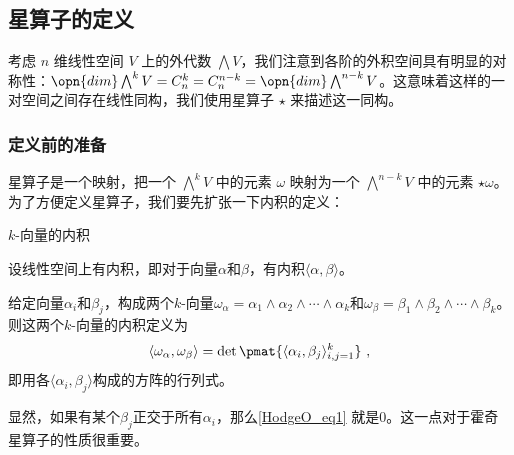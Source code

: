


\subsection{星算子的定义}

考虑 $n$ 维线性空间 $V$ 上的外代数 $\bigwedge V$，我们注意到各阶的外积空间具有明显的对称性：$\opn{dim}\bigwedge^k V=C^k_n=C^{n-k}_n=\opn{dim}\bigwedge^{n-k} V$。这意味着这样的一对空间之间存在线性同构，我们使用星算子 $\star$ 来描述这一同构。


\subsubsection{定义前的准备}


星算子是一个映射，把一个 $\bigwedge^k V$ 中的元素 $\omega$ 映射为一个 $\bigwedge^{n-k} V$ 中的元素 $\star\omega$。为了方便定义星算子，我们要先扩张一下内积的定义：


\begin{definition}{$k$-向量的内积}\label{HodgeO_def1}

设线性空间上有内积，即对于向量$\alpha$和$\beta$，有内积$\langle \alpha, \beta \rangle$。

给定向量$\alpha_i$和$\beta_j$，构成两个$k$-向量$\omega_\alpha=\alpha_1\wedge \alpha_2\wedge \cdots\wedge \alpha_k$和$\omega_\beta=\beta_1\wedge \beta_2\wedge \cdots\wedge \beta_k$。则这两个$k$-向量的内积定义为
\begin{equation}\label{HodgeO_eq1}
\langle\omega_\alpha, \omega_\beta\rangle = \det \pmat{\langle \alpha_i, \beta_j \rangle_{i, j=1}^k}~,
\end{equation}
即用各$\langle \alpha_i, \beta_j \rangle$构成的方阵的行列式。

\end{definition}

显然，如果有某个$\beta_j$正交于所有$\alpha_i$，那么\autoref{HodgeO_eq1} 就是$0$。这一点对于霍奇星算子的性质很重要。







